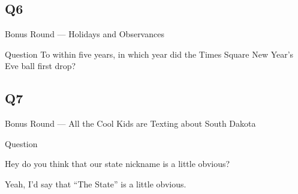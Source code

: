 \documentclass[11pt]{beamer}
\begin{document}
\subsection*{Q6}
\begin{frame}[t]{Bonus Round --- Holidays and Observances}
\begin{block}{Question}
To within five years, in which year did the Times Square New Year's Eve ball first drop?
\end{block}
\end{frame}
\subsection*{Q7}
\begin{frame}[t]{Bonus Round --- All the Cool Kids are Texting about South Dakota}
\begin{block}{Question}

\begin{minipage}{0.9\textwidth}
\begin{mdframed}[
    roundcorner=7pt,
    backgroundcolor=black!5,
    linecolor=black!5,
    fontcolor=black,
    ignorelastdescenders]
\begin{flushleft}
{\small{}\selectfont{}
Hey do you think that our state nickname is a little obvious?
}
\end{flushleft}
\end{mdframed}
\end{minipage}

\hfill{}\begin{minipage}{0.9\textwidth}
\begin{mdframed}[
    roundcorner=7pt,
    backgroundcolor=blue!80!white,
    linecolor=blue!80!white,
    fontcolor=white,
    ignorelastdescenders]
\begin{flushleft}
{\small{}\selectfont{}
Yeah, I'd say that ``The \textunderscore{}\textunderscore{}\textunderscore{}\textunderscore{}\textunderscore{}\textunderscore{} \textunderscore{}\textunderscore{}\textunderscore{}\textunderscore{}\textunderscore{}\textunderscore{} State'' is a little obvious.
}
\end{flushleft}
\end{mdframed}
\end{minipage}
\end{block}
\end{frame}
\end{document}
